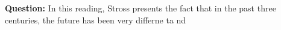 \textbf{Question:}
In this reading, Stross presents the fact that in the past three centuries, the future has been very differne ta nd